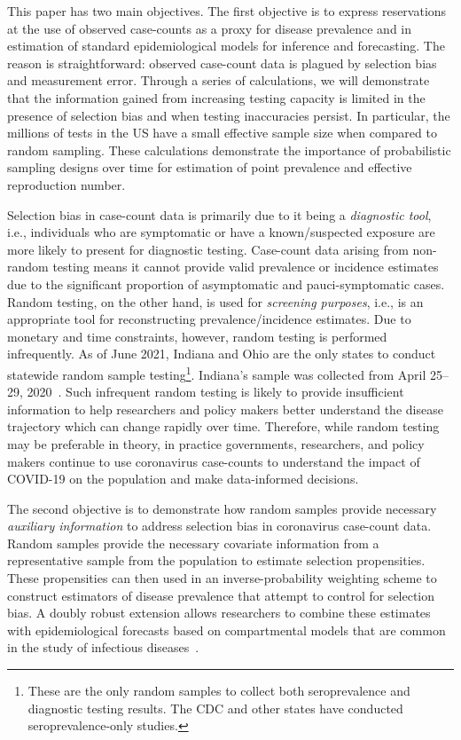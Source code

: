 \documentclass[11pt]{amsart}
\numberwithin{equation}{section}
\theoremstyle{plain}
\begin{document}
This paper has two main objectives.  The first objective is to express reservations at the use of observed case-counts as a proxy for disease prevalence and in estimation of standard epidemiological models for inference and forecasting.  The reason is straightforward: observed case-count data is plagued by selection bias and measurement error. Through a series of calculations, we will demonstrate that the information gained from increasing testing capacity is limited in the presence of selection bias and when testing inaccuracies persist.  In particular, the millions of tests in the US have a small effective sample size when compared to random sampling. These calculations demonstrate the importance of probabilistic sampling designs over time for estimation of point prevalence and effective reproduction number.

Selection bias in case-count data is primarily due to it being a \emph{diagnostic tool}, i.e., individuals who are symptomatic or have a known/suspected exposure are more likely to present for diagnostic testing.  Case-count data arising from non-random testing means it cannot provide valid prevalence or incidence estimates due to the significant proportion of asymptomatic and pauci-symptomatic cases. Random testing, on the other hand, is used for \emph{screening purposes}, i.e., is an appropriate tool for reconstructing prevalence/incidence estimates. Due to monetary and time constraints, however, random testing is performed infrequently.  As of June 2021, Indiana and Ohio are the only states to conduct statewide random sample testing\footnote{These are the only random samples to collect both seroprevalence and diagnostic testing results. The CDC and other states have conducted seroprevalence-only studies.}. Indiana's sample was collected from April 25--29, 2020~\citep{Yiannoutsos2021}.  Such infrequent random testing is likely to provide insufficient information to help researchers and policy makers better understand the disease trajectory which can change rapidly over time.  Therefore, while random testing may be preferable in theory, in practice governments, researchers, and policy makers continue to use coronavirus case-counts to understand the impact of COVID-19 on the population and make data-informed decisions.


The second objective is to demonstrate how random samples provide necessary \emph{auxiliary information} to address selection bias in coronavirus case-count data.  Random samples provide the necessary covariate information from a representative sample from the population to estimate selection propensities. These propensities can then used in an inverse-probability weighting scheme to construct estimators of disease prevalence that attempt to control for selection bias.  A doubly robust extension allows researchers to combine these estimates with epidemiological forecasts based on compartmental models that are common in the study of infectious diseases~\citep{Hao2020,Song2020,Ray2020,Johndrow2020}.
\end{document}
